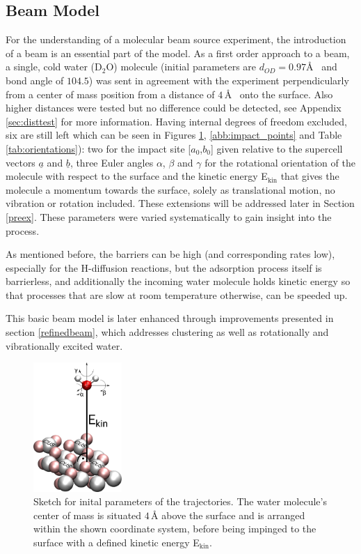 \documentclass[11pt,DIV=13,BCOR=5mm,a4paper,headinclude]{scrbook}
\renewcommand{\vec}[1]{\underline{#1}}
\begin{document}
\subsection{Beam Model} \label{beammodel}
For the understanding of a molecular beam source experiment, the introduction of a beam is an essential part of the model.
As a first order approach to a beam, a single, cold water (D$_2$O) molecule (initial parameters are $d_{OD}=0.97$\AA~ and bond angle of $104.5$\textdegree) was sent in agreement with the experiment perpendicularly from a center of mass position from a distance of $4\,$\AA~ onto the surface.
Also higher distances were tested but no difference could be detected, see Appendix \ref{sec:disttest} for more information.
Having internal degrees of freedom excluded, six are still left which can be seen in Figures \ref{abb:initial_parameters}, \ref{abb:impact_points} and Table \ref{tab:orientations}): two for the impact site [$a_0$,$b_0$] given relative to the supercell vectors $\vec{a}$ and $\vec{b}$, three Euler angles $\alpha$, $\beta$ and $\gamma$ for the rotational orientation of the molecule with respect to the surface and the kinetic energy E$_\textrm{kin}$ that gives the molecule a momentum towards the surface, solely as translational motion, no vibration or rotation included.
These extensions will be addressed later in Section \ref{preex}.
These parameters were varied systematically to gain insight into the process.


As mentioned before, the barriers can be high (and corresponding rates low), especially for the H-diffusion reactions, but the adsorption process itself is barrierless, and additionally the incoming water molecule holds kinetic energy so that processes that are slow at room temperature otherwise, can be speeded up.


This basic beam model is later enhanced through improvements presented in section \ref{refinedbeam}, which addresses clustering as well as rotationally and vibrationally excited water.

\begin{figure}[!ht]
 \centering
\includegraphics[width=0.3\textwidth]{figures/0001/perspective+h2o_new.png}
 \caption{Sketch for inital parameters of the trajectories.
The water molecule's center of mass is situated $4\,$\AA{} above the surface and is arranged within the shown coordinate system, before being impinged to the surface with a defined kinetic energy E$_\textrm{kin}$.}
        \label{abb:initial_parameters}
 \end{figure}
 
\end{document}
